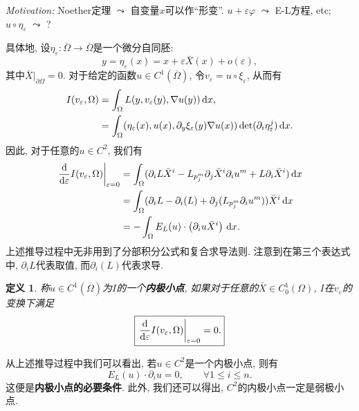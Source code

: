 \documentclass[12pt,a4paper]{article}
\newtheorem{definition}[theorem]{定义}
\begin{document}
\emph{Motivation:} Noether定理 $\leadsto$ 自变量$x$可以作``形变''. 
$u + \varepsilon\varphi$ $\leadsto$ E-L方程, etc; $u \circ \eta_{\varepsilon}$ $\leadsto$ ? 

具体地, 设$\eta_{\varepsilon}\colon \overline{\Omega} \rightarrow \overline{\Omega}$是一个微分自同胚:
\begin{equation*}
    y = \eta_{\varepsilon}(x) = x + \varepsilon\bar{X}(x) + o(\varepsilon),
\end{equation*}
其中$\bar{X}|_{\partial\Omega} = 0$. 对于给定的函数$u \in C^1(\overline{\Omega})$, 令$v_{\varepsilon} = u \circ \xi_{\varepsilon}$, 从而有 
\begin{align*}
    I(v_{\varepsilon}, \Omega) &= \int_{\Omega}L(y, v_{\varepsilon}(y), \nabla u(y)) \,{\rm d}x,\\  
    &= \int_{\Omega}(\eta_{\varepsilon}(x), u(x), \partial_y\xi_{\varepsilon}(y)\nabla u(x))\det(\partial_i\eta_{\varepsilon}^j) \,{\rm d}x. 
\end{align*}
因此, 对于任意的$u \in C^2$, 我们有
\begin{align*}
    \left.\frac{{\rm d}}{{\rm d}\varepsilon}I(v_{\varepsilon}, \Omega)\right|_{\varepsilon = 0} &= \int_{\Omega}(\partial_iL\bar{X}^i  -L_{p_j^m}\partial_j\bar{X}^i\partial_iu^m + L\partial_i\bar{X}^i) \,{\rm d}x \\
    &= \int_{\Omega}(\partial_iL -\partial_i(L) +\partial_j(L_{p_j^m}\partial_iu^m))\bar{X}^i \,{\rm d}x \\  
    &= -\int_{\Omega}E_L(u) \cdot \left(\partial_iu\bar{X}^i\right) \,{\rm d}x. 
\end{align*} 
上述推导过程中无非用到了分部积分公式和复合求导法则. 注意到在第三个表达式中, $\partial_iL$代表取值, 而$\partial_i(L)$代表求导.

\begin{definition}
    称$u \in C^1(\overline{\Omega})$为$I$的一个\textbf{内极小点}, 如果对于任意的$\bar{X} \in C_0^1(\Omega)$, $I$在$v_{\varepsilon}$的变换下满足
    \begin{equation*}
        \boxed{\left.\frac{{\rm d}}{{\rm d}\varepsilon}I(v_{\varepsilon}, \Omega)\right|_{\varepsilon = 0}  = 0.}
    \end{equation*} 
\end{definition}

从上述推导过程中我们可以看出, 若$u \in C^2$是一个内极小点, 则有 
\begin{equation*}
    \boxed{E_L(u) \cdot \partial_iu = 0, \qquad \forall 1 \leq i \leq n.}
\end{equation*}
这便是\textbf{内极小点的必要条件}. 此外, 我们还可以得出, $C^2$的内极小点一定是弱极小点.
\end{document}

